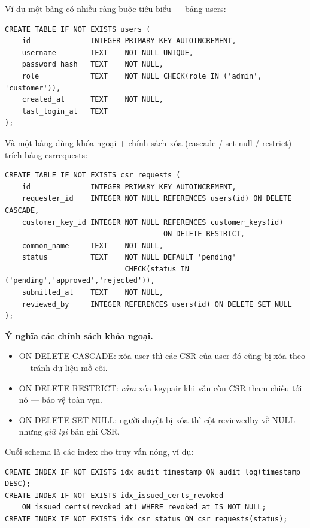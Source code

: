 \documentclass[12pt,a4paper]{article}
\newcommand{\code}[1]{{\ttfamily\small\def\_{\textunderscore\discretionary{}{}{}}#1}}
\begin{document}
Ví dụ một bảng có nhiều ràng buộc tiêu biểu — bảng \code{users}:

\begin{Verbatim}
CREATE TABLE IF NOT EXISTS users (
    id              INTEGER PRIMARY KEY AUTOINCREMENT,
    username        TEXT    NOT NULL UNIQUE,
    password_hash   TEXT    NOT NULL,
    role            TEXT    NOT NULL CHECK(role IN ('admin', 'customer')),
    created_at      TEXT    NOT NULL,
    last_login_at   TEXT
);
\end{Verbatim}

Và một bảng dùng khóa ngoại + chính sách xóa (cascade / set null / restrict) —
trích bảng \code{csr\_requests}:

\begin{Verbatim}
CREATE TABLE IF NOT EXISTS csr_requests (
    id              INTEGER PRIMARY KEY AUTOINCREMENT,
    requester_id    INTEGER NOT NULL REFERENCES users(id) ON DELETE CASCADE,
    customer_key_id INTEGER NOT NULL REFERENCES customer_keys(id)
                                     ON DELETE RESTRICT,
    common_name     TEXT    NOT NULL,
    status          TEXT    NOT NULL DEFAULT 'pending'
                            CHECK(status IN ('pending','approved','rejected')),
    submitted_at    TEXT    NOT NULL,
    reviewed_by     INTEGER REFERENCES users(id) ON DELETE SET NULL
);
\end{Verbatim}

\textbf{Ý nghĩa các chính sách khóa ngoại.}
\begin{itemize}
  \item \code{ON DELETE CASCADE}: xóa user thì các CSR của user đó cũng bị xóa
        theo — tránh dữ liệu mồ côi.
  \item \code{ON DELETE RESTRICT}: \emph{cấm} xóa keypair khi vẫn còn CSR tham
        chiếu tới nó — bảo vệ toàn vẹn.
  \item \code{ON DELETE SET NULL}: người duyệt bị xóa thì cột \code{reviewed\_by}
        về NULL nhưng \emph{giữ lại} bản ghi CSR.
\end{itemize}

Cuối schema là các index cho truy vấn nóng, ví dụ:

\begin{Verbatim}
CREATE INDEX IF NOT EXISTS idx_audit_timestamp ON audit_log(timestamp DESC);
CREATE INDEX IF NOT EXISTS idx_issued_certs_revoked
    ON issued_certs(revoked_at) WHERE revoked_at IS NOT NULL;
CREATE INDEX IF NOT EXISTS idx_csr_status ON csr_requests(status);
\end{Verbatim}
\end{document}
